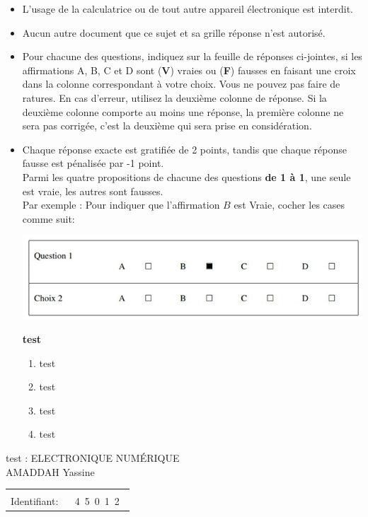\documentclass{book}%
\begin{document}
\begin{itemize}%
\item%
L'usage de la calculatrice ou de tout autre appareil électronique est interdit.%
\item%
Aucun autre document que ce sujet et sa grille réponse n'est autorisé.%
\item%
Pour chacune des questions, indiquez sur la feuille de réponses ci-jointes, si les affirmations A, B, C et D sont (\textbf{V}) vraies ou (\textbf{F}) fausses en faisant une croix dans la colonne correspondant à votre choix. Vous ne pouvez pas faire de ratures. En cas d'erreur, utilisez la deuxième colonne de réponse. Si la deuxième colonne comporte au moins une réponse, la première colonne ne sera pas corrigée, c'est la deuxième qui sera prise en considération.%
\item%
Chaque réponse exacte est gratifiée de 2 points, tandis que chaque réponse fausse est pénalisée par -1 point. \\ 	Parmi les quatre propositions de chacune des questions \textbf{de 1 à 1}, une seule est vraie, les autres sont fausses. \\ 	Par exemple : Pour indiquer que l'affirmation $B$ est Vraie, cocher les cases comme suit:  \\ \begin{center}	\includegraphics[scale=0.8]{reponses.png} \end{center}%
\thispagestyle{empty}%
\begin{exercise}%
\textbf{test }%
\begin{enumerate}[label=\textbf{\Alph*. }]%
\item%
test%
\item%
test%
\item%
test%
\item%
test%
\end{enumerate}%
\end{exercise}%
\end{itemize}%
\newpage%
\thispagestyle{empty}%
test : ELECTRONIQUE NUMÉRIQUE $\qquad \qquad \qquad \qquad \qquad \qquad \qquad \qquad$ AMADDAH Yassine%
\begin{flushright}%
\begin{tabular}{|l|}%
\hline%
 \\%
\thispagestyle{empty}%
Identifiant: $\quad$ {\Large 4~5~0~1~2~}%
 \\%
\hline%
\end{tabular}%
\end{flushright}%
\end{document}
